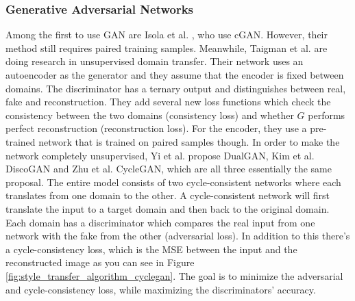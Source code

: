\documentclass[conference]{IEEEtran}
\begin{document}
\subsubsection{Generative Adversarial Networks}
Among the first to use GAN are Isola et al. \cite{Isola2016}, who use cGAN.
However, their method still requires paired training samples.
Meanwhile, Taigman et al. \cite{Taigman2016} are doing research in unsupervised domain transfer.
Their network uses an autoencoder as the generator and they assume that the encoder is fixed between domains.
The discriminator has a ternary output and distinguishes between real, fake and reconstruction.
They add several new loss functions which check the consistency between the two domains (consistency loss) and whether $G$ performs perfect reconstruction (reconstruction loss).
For the encoder, they use a pre-trained network that is trained on paired samples though.
In order to make the network completely unsupervised, Yi et al.\cite{Yi2017} propose DualGAN, Kim et al. \cite{Kim2017} DiscoGAN and Zhu et al. \cite{Zhu2017b} CycleGAN, which are all three essentially the same proposal.
The entire model consists of two cycle-consistent networks where each translates from one domain to the other.
A cycle-consistent network will first translate the input to a target domain and then back to the original domain.
Each domain has a discriminator which compares the real input from one network with the fake from the other (adversarial loss).
In addition to this there's a cycle-consistency loss, which is the MSE between the input and the reconstructed image as you can see in Figure \ref{fig:style_transfer_algorithm_cyclegan}.
The goal is to minimize the adversarial and cycle-consistency loss, while maximizing the discriminators' accuracy.

\begin{figure}[h]
	\centering
\end{figure}
\end{document}
